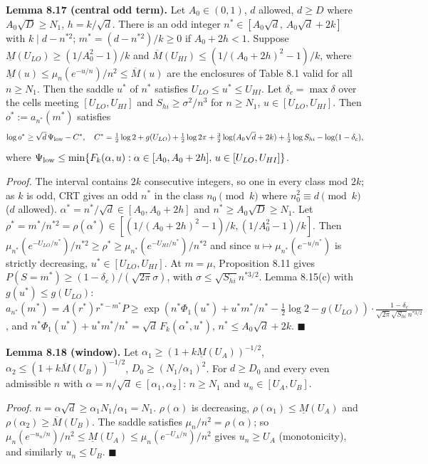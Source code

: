 \textbf{Lemma 8.17 (central odd term).} Let \(A_0\in(0,1)\), \(d\) allowed, \(d\ge D\) where \(A_0\sqrt D\ge N_1\), \(h=k/\sqrt d\). There is an odd integer \(n^*\in[A_0\sqrt d,\,A_0\sqrt d+2k]\) with \(k\mid d-n^{*2}\); \(m^*=(d-n^{*2})/k\ge0\) if \(A_0+2h<1\). Suppose \(\underline M(U_{LO})\ge(1/A_0^2-1)/k\) and \(\overline M(U_{HI})\le(1/(A_0+2h)^2-1)/k\), where \(\underline M(u)\le\mu_n(e^{-u/n})/n^2\le\overline M(u)\) are the enclosures of Table 8.1 valid for all \(n\ge N_1\). Then the saddle \(u^*\) of \(n^*\) satisfies \(U_{LO}\le u^*\le U_{HI}\). Let \(\delta_c=\max\delta\) over the cells meeting \([U_{LO},U_{HI}]\) and \(S_{hi}\ge\sigma^2/n^3\) for \(n\ge N_1\), \(u\in[U_{LO},U_{HI}]\). Then \(o^*:=a_{n^*}(m^*)\) satisfies
\[\log o^*\ge\sqrt d\,\Psi_{\rm low}-C^*,\quad C^*=\tfrac12\log2+g(U_{LO})+\tfrac12\log2\pi+\tfrac32\log(A_0\sqrt d+2k)+\tfrac12\log S_{hi}-\log(1-\delta_c),\]
where \(\Psi_{\rm low}\le\min\{F_k(\alpha,u):\alpha\in[A_0,A_0+2h],\,u\in[U_{LO},U_{HI}]\}\).

\emph{Proof.} The interval contains \(2k\) consecutive integers, so one in every class mod \(2k\); as \(k\) is odd, CRT gives an odd \(n^*\) in the class \(n_0\pmod k\) where \(n_0^2\equiv d\pmod k\) (\(d\) allowed). \(\alpha^*=n^*/\sqrt d\in[A_0,A_0+2h]\) and \(n^*\ge A_0\sqrt D\ge N_1\). Let \(\rho^*=m^*/n^{*2}=\rho(\alpha^*)\in[(1/(A_0+2h)^2-1)/k,(1/A_0^2-1)/k]\). Then \(\mu_{n^*}(e^{-U_{LO}/n^*})/n^{*2}\ge\rho^*\ge\mu_{n^*}(e^{-U_{HI}/n^*})/n^{*2}\) and since \(u\mapsto\mu_{n^*}(e^{-u/n^*})\) is strictly decreasing, \(u^*\in[U_{LO},U_{HI}]\). At \(m=\mu\), Proposition 8.11 gives \(P(S=m^*)\ge(1-\delta_c)/(\sqrt{2\pi}\sigma)\), with \(\sigma\le\sqrt{S_{hi}}n^{*3/2}\). Lemma 8.15(c) with \(g(u^*)\le g(U_{LO})\): \(a_{n^*}(m^*)=A(r^*)r^{*-m^*}P\ge\exp(n^*\Phi_1(u^*)+u^*m^*/n^*-\frac12\log2-g(U_{LO}))\cdot\frac{1-\delta_c}{\sqrt{2\pi}\sqrt{S_{hi}}n^{*3/2}}\), and \(n^*\Phi_1(u^*)+u^*m^*/n^*=\sqrt d\,F_k(\alpha^*,u^*)\), \(n^*\le A_0\sqrt d+2k\). \(\blacksquare\)

\textbf{Lemma 8.18 (window).} Let \(\alpha_1\ge(1+k\underline M(U_A))^{-1/2}\), \(\alpha_2\le(1+k\overline M(U_B))^{-1/2}\), \(D_0\ge(N_1/\alpha_1)^2\). For \(d\ge D_0\) and every even admissible \(n\) with \(\alpha=n/\sqrt d\in[\alpha_1,\alpha_2]\): \(n\ge N_1\) and \(u_n\in[U_A,U_B]\).

\emph{Proof.} \(n=\alpha\sqrt d\ge\alpha_1N_1/\alpha_1=N_1\). \(\rho(\alpha)\) is decreasing, \(\rho(\alpha_1)\le\underline M(U_A)\) and \(\rho(\alpha_2)\ge\overline M(U_B)\). The saddle satisfies \(\mu_n/n^2=\rho(\alpha)\); so \(\mu_n(e^{-u_n/n})/n^2\le\underline M(U_A)\le\mu_n(e^{-U_A/n})/n^2\) gives \(u_n\ge U_A\) (monotonicity), and similarly \(u_n\le U_B\). \(\blacksquare\)

